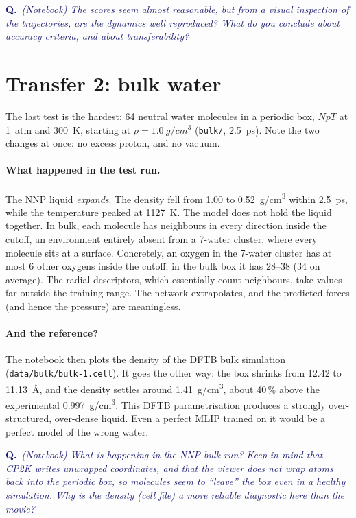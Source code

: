 \documentclass[11pt,a4paper]{article}
\newcommand{\question}[1]{\par\smallskip\noindent\textcolor{MidnightBlue}{\textbf{Q.}~\emph{#1}}\par\smallskip}
\begin{document}
\question{(Notebook) The scores seem almost reasonable, but from a visual
inspection of the trajectories, are the dynamics well reproduced? What do you
conclude about accuracy criteria, and about transferability?}

\section{Transfer 2: bulk water}
\label{sec:bulk}

The last test is the hardest: 64 neutral water molecules in a periodic box,
$NpT$ at \SI{1}{atm} and \SI{300}{K}, starting at
$\rho = \SI{1.0}{g/cm^3}$ (\texttt{bulk/}, \SI{2.5}{ps}). Note the two
changes at once: no excess proton, and no vacuum.

\paragraph{What happened in the test run.} The NNP liquid \emph{expands}. The
density fell from 1.00 to \SI{0.52}{g/cm^3} within \SI{2.5}{ps}, while the
temperature peaked at \SI{1127}{K}. The model does not hold the liquid
together. In bulk, each molecule has neighbours in every direction inside the
cutoff, an environment entirely absent from a 7-water cluster, where every
molecule sits at a surface. Concretely, an oxygen in the 7-water cluster has
at most 6 other oxygens inside the cutoff; in the bulk box it has 28--38 (34 on
average). The radial descriptors, which essentially count neighbours, take
values far outside the training range. The network extrapolates, and the
predicted forces (and hence the pressure) are meaningless.

\paragraph{And the reference?} The notebook then plots the density of the
DFTB bulk simulation (\texttt{data/bulk/bulk-1.cell}). It goes the other
way: the box shrinks from 12.42 to \SI{11.13}{\angstrom}, and the density
settles around \SI{1.41}{g/cm^3}, about 40\,\% above the experimental
\SI{0.997}{g/cm^3}. This DFTB parametrisation produces a strongly
over-structured, over-dense liquid. Even a perfect MLIP trained on it would be
a perfect model of the wrong water.

\question{(Notebook) What is happening in the NNP bulk run? Keep in mind that
CP2K writes unwrapped coordinates, and that the viewer does not wrap atoms
back into the periodic box, so molecules seem to ``leave'' the box even in a
healthy simulation. Why is the density (cell file) a more reliable
diagnostic here than the movie?}
\end{document}

